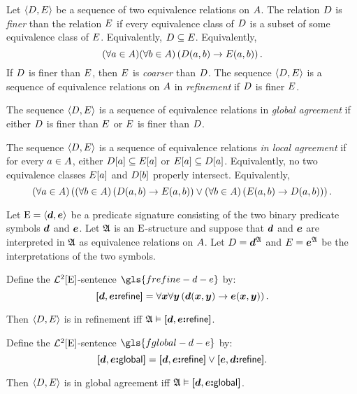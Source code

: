 \begin{definition}
Let $\left\langle D, E \right\rangle$ be a sequence of two equivalence relations on $A$.
The relation $D$ is \emph{finer} than the relation $E$ if every
equivalence class of $D$ is a subset of some equivalence class of $E$.
Equivalently, $D \subseteq E$. Equivalently,
\[
  (\forall a \in A)(\forall b \in A)
  \left(D(a, b) \rightarrow E(a, b)\right).
\]
If $D$ is finer than $E$, then $E$ is \emph{coarser} than $D$.
The sequence $\left\langle D, E \right\rangle$ is a sequence of equivalence relations on
$A$ in \emph{refinement} if $D$ is finer $E$.

The sequence $\left\langle D, E \right\rangle$ is a sequence of equivalence relations in
\emph{global agreement} if either $D$ is finer than $E$ or $E$ is
finer than $D$.

The sequence $\left\langle D, E \right\rangle$ is a sequence of equivalence relations
\emph{in local agreement} if for every $a \in A$, 
either $D[a] \subseteq E[a]$ or $E[a] \subseteq D[a]$.
Equivalently, no two equivalence classes $E[a]$ and $D[b]$ properly
intersect. Equivalently,
\[
  (\forall a \in A)
  \left((\forall b \in A)
  \left(D(a, b) \rightarrow E(a,b)\right)
  \lor (\forall b \in A)
  \left(E(a, b) \rightarrow D(a, b)\right)\right).
\]
\end{definition}

Let $\mathrm{E} = \left\langle \bm{d}, \bm{e} \right\rangle$ be a predicate signature consisting of the two binary
predicate symbols $\bm{d}$ and $\bm{e}$.
Let $\mathfrak{A}$ is an $\mathrm{E}$-structure and suppose that $\bm{d}$ and $\bm{e}$ are
interpreted in $\mathfrak{A}$ as equivalence relations on $A$.
Let $D = \bm{d}^{\mathfrak{A}}$ and $E = \bm{e}^{\mathfrak{A}}$ be the interpretations of
the two symbols.

\begin{definition}
Define the $\mathcal{L}^{2}[\mathrm{E}]$-sentence $\gls{frefine-d-e}$ by:
\[
  {\bm{[}\bm{d},\bm{e}\mathord{\bm{:}}\mathsf{refine}\bm{]}} = \forall\bm{x} \forall\bm{y}
  \left(\bm{d}(\bm{x}, \bm{y}) \rightarrow \bm{e}(\bm{x}, \bm{y})\right).
\]
\end{definition}
Then $\left\langle D, E \right\rangle$ is in refinement iff 
$\mathfrak{A} \vDash {\bm{[}\bm{d},\bm{e}\mathord{\bm{:}}\mathsf{refine}\bm{]}}$.

\begin{definition}
Define the $\mathcal{L}^{2}[\mathrm{E}]$-sentence $\gls{fglobal-d-e}$ by:
\[
  {\bm{[}\bm{d},\bm{e}\mathord{\bm{:}}\mathsf{global}\bm{]}} = {\bm{[}\bm{d},\bm{e}\mathord{\bm{:}}\mathsf{refine}\bm{]}} \lor {\bm{[}\bm{e},\bm{d}\mathord{\bm{:}}\mathsf{refine}\bm{]}}.
\]
\end{definition}
Then $\left\langle D, E \right\rangle$ is in global agreement iff
$\mathfrak{A} \vDash {\bm{[}\bm{d},\bm{e}\mathord{\bm{:}}\mathsf{global}\bm{]}}$.

